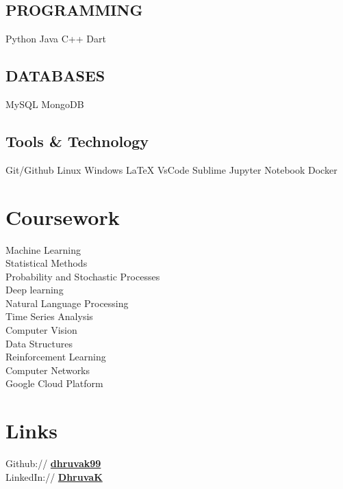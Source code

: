 \documentclass[]{deedy-resume-reversed}
\begin{document}
\begin{minipage}[t]{0.30\textwidth}
\subsection{PROGRAMMING}
\large{Python \textbullet{} Java \textbullet{} C++ \textbullet{} Dart}
\sectionsep

\subsection{DATABASES}
\large{MySQL \textbullet{} MongoDB}
\sectionsep

\subsection{Tools \& Technology}
\large{Git/Github \textbullet{} Linux
\textbullet{} Windows \textbullet{} \LaTeX \textbullet{} VsCode \textbullet{} Sublime \textbullet{} Jupyter Notebook \textbullet{} Docker \\}
\sectionsep


\section{Coursework}
\large{Machine Learning \\
Statistical Methods \\
Probability and Stochastic Processes\\
Deep learning\\
Natural Language Processing \\
Time Series Analysis \\
Computer Vision \\
Data Structures \\
Reinforcement Learning \\
Computer Networks \\
Google Cloud Platform \\}
\sectionsep



\section{Links}
\large{Github:// \href{https://github.com/dhruvak99}{\bf dhruvak99} \\
LinkedIn://  \href{https://www.linkedin.com/in/dhruva-k-72600318a/}{\bf DhruvaK}}
\sectionsep

\end{minipage}
\end{document}
